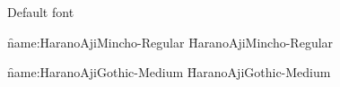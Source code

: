 

\nopagenumbers

Default font

\font\f{name:HaranoAjiMincho-Regular} \f
HaranoAjiMincho-Regular

\font\f{name:HaranoAjiGothic-Medium} \f
HaranoAjiGothic-Medium

\bye
